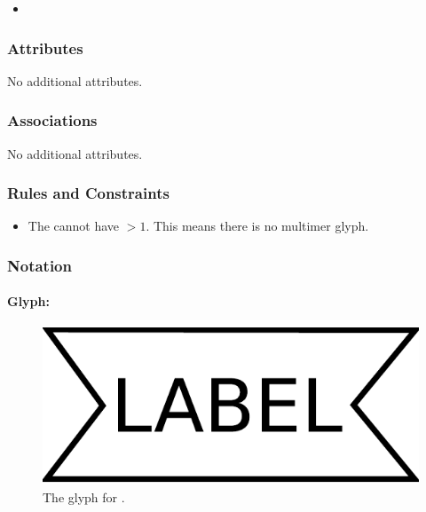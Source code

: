 \begin{itemize}
\item {}
\end{itemize}

\subsubsection{Attributes}

No additional attributes.

\subsubsection{Associations}

No additional attributes.

\subsubsection{Rules and Constraints}

\begin{itemize}
\item The  cannot have  $>
  1$. This means there is no multimer glyph.
\end{itemize}

\subsubsection{Notation}

\paragraph{Glyph: }

\begin{figure}[H]
  \centering
  \includegraphics[scale = 0.3]{images/perturbing_agent}
  \caption{The \PD glyph for .}
  \label{fig:perturbing agent}
\end{figure}

